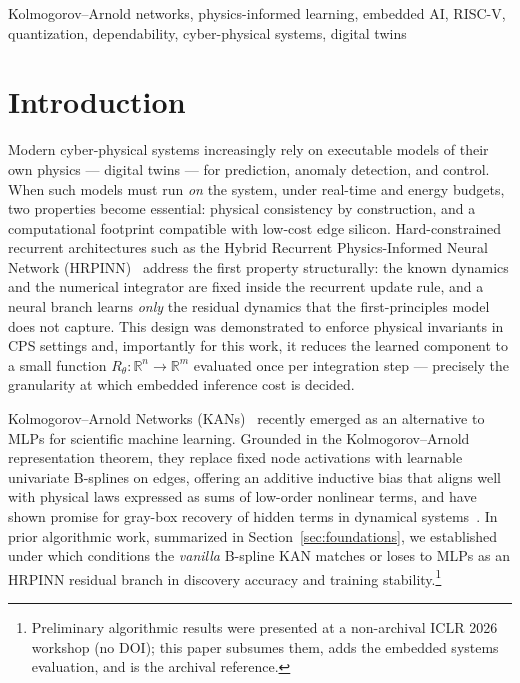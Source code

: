 \documentclass[conference]{IEEEtran}
\begin{document}
\begin{IEEEkeywords}
Kolmogorov--Arnold networks, physics-informed learning, embedded AI, RISC-V,
quantization, dependability, cyber-physical systems, digital twins
\end{IEEEkeywords}

\section{Introduction}
\label{sec:intro}

Modern cyber-physical systems increasingly rely on executable models of their
own physics --- digital twins --- for prediction, anomaly detection, and
control. When such models must run \emph{on} the system, under real-time and
energy budgets, two properties become essential: physical consistency by
construction, and a computational footprint compatible with low-cost edge
silicon. Hard-constrained recurrent architectures such as the Hybrid Recurrent
Physics-Informed Neural Network (HRPINN)~\cite{spotorno2025hard} address the
first property structurally: the known dynamics and the numerical integrator
are fixed inside the recurrent update rule, and a neural branch learns
\emph{only} the residual dynamics that the first-principles model does not
capture. This design was demonstrated to enforce physical invariants in CPS
settings and, importantly for this work, it reduces the learned component to a
small function $R_\theta:\mathbb{R}^n\!\to\!\mathbb{R}^m$ evaluated once per
integration step --- precisely the granularity at which embedded inference
cost is decided.

Kolmogorov--Arnold Networks (KANs)~\cite{liu2024kan} recently emerged as an
alternative to MLPs for scientific machine learning. Grounded in the
Kolmogorov--Arnold representation theorem, they replace fixed node activations
with learnable univariate B-splines on edges, offering an additive inductive
bias that aligns well with physical laws expressed as sums of low-order
nonlinear terms, and have shown promise for gray-box recovery of hidden terms
in dynamical systems~\cite{koenig2024kan,ma2025integrating,daryakenari2026representation,liu2025structured}.
In prior algorithmic work, summarized in Section~\ref{sec:foundations}, we
established under which conditions the \emph{vanilla} B-spline KAN matches or
loses to MLPs as an HRPINN residual branch in discovery accuracy and training
stability.\footnote{Preliminary algorithmic results were presented at a
non-archival ICLR 2026 workshop (no DOI); this paper subsumes them, adds the
embedded systems evaluation, and is the archival reference.}
\end{document}

